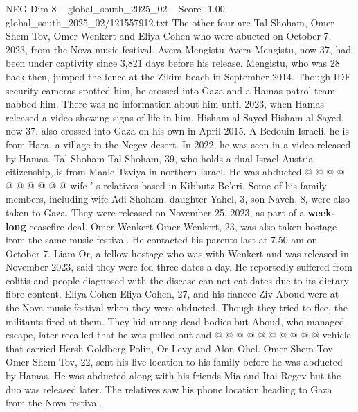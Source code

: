 \begin{textsample}{NEG Dim 8 – global\_south\_2025\_02 – Score -1.00 – global\_south\_2025\_02/121557912.txt}  \label{ex:f8_neg_376}
The other four are Tal Shoham, Omer Shem Tov, Omer Wenkert and Eliya Cohen who were abucted on October 7, 2023, from the Nova music festival.
Avera Mengistu Avera Mengistu, now 37, had been under captivity since 3,821 days before his release.
Mengistu, who was 28 back then, jumped the fence at the Zikim beach in September 2014.
Though IDF security cameras spotted him, he crossed into Gaza and a Hamas patrol team nabbed him.
There was no information about him until 2023, when Hamas released a video showing signs of life in him.
Hisham al-Sayed Hisham al-Sayed, now 37, also crossed into Gaza on his own in April 2015.
A Bedouin Israeli, he is from Hara, a village in the Negev desert.
In 2022, he was seen in a video released by Hamas.
Tal Shoham Tal Shoham, 39, who holds a dual Israel-Austria citizenship, is from Maale Tzviya in northern Israel.
He was abducted @ @ @ @ @ @ @ @ @ @ wife ' s relatives based in Kibbutz Be'eri.
Some of his family members, including wife Adi Shoham, daughter Yahel, 3, son Naveh, 8, were also taken to Gaza.
They were released on November 25, 2023, as part of a \textbf{week-long} ceasefire deal.
Omer Wenkert Omer Wenkert, 23, was also taken hostage from the same music festival.
He contacted his parents last at 7.50 am on October 7.
Liam Or, a fellow hostage who was with Wenkert and was released in November 2023, said they were fed three dates a day.
He reportedly suffered from colitis and people diagnosed with the disease can not eat dates due to its dietary fibre content.
Eliya Cohen Eliya Cohen, 27, and his fiancee Ziv Aboud were at the Nova music festival when they were abducted.
Though they tried to flee, the militants fired at them.
They hid among dead bodies but Aboud, who managed escape, later recalled that he was pulled out and @ @ @ @ @ @ @ @ @ @ vehicle that carried Hersh Goldberg-Polin, Or Levy and Alon Ohel.
Omer Shem Tov Omer Shem Tov, 22, sent his live location to his family before he was abducted by Hamas.
He was abducted along with his friends Mia and Itai Regev but the duo was released later.
The relatives saw his phone location heading to Gaza from the Nova festival.

\end{textsample}
